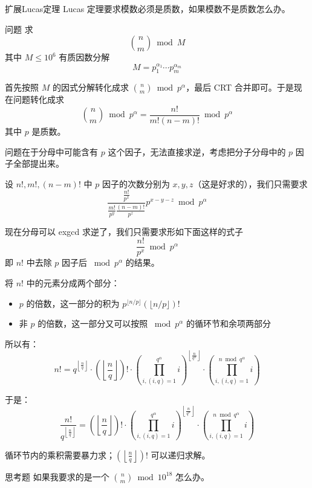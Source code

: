\documentclass[UTF8]{beamer}
\begin{document}
    \begin{frame}{扩展Lucas定理}
        Lucas 定理要求模数必须是质数，如果模数不是质数怎么办。
        \begin{block}{问题}
            求
            $$
            \binom{n}{m}\bmod M
            $$
            其中 $M\le 10^6$ 有质因数分解
            $$
            M = p_1^{\alpha_1}\cdots p_m^{\alpha_m}
            $$
        \end{block}
        \pause

        首先按照 $M$ 的因式分解转化成求 $\binom{n}{m}\bmod p^{\alpha}$，最后 CRT 合并即可。于是现在问题转化成求
        $$
        \binom{n}{m}\bmod p^\alpha=\frac{n!}{m!(n-m)!}\bmod p^\alpha
        $$
        其中 $p$ 是质数。
    \end{frame}

    \begin{frame}
        问题在于分母中可能含有 $p$ 这个因子，无法直接求逆，考虑把分子分母中的 $p$ 因子全部提出来。

        设 $n!,m!,(n-m)!$ 中 $p$ 因子的次数分别为 $x,y,z$（这是好求的），我们只需要求
        $$
        \frac{\frac{n!}{p^x}}{\frac{m!}{p^y}\frac{(n-m)!}{p^z}}p^{x-y-z}\bmod p^\alpha
        $$

        现在分母可以 exgcd 求逆了，我们只需要求形如下面这样的式子
        $$
        \frac{n!}{p^x}\bmod p^{\alpha}
        $$
        即 $n!$ 中去除 $p$ 因子后 $\bmod p^{\alpha}$ 的结果。
    \end{frame}
    
    \begin{frame}
        将 $n!$ 中的元素分成两个部分：
        \begin{itemize}
            \item $p$ 的倍数，这一部分的积为 $p^{\lfloor n/p\rfloor}(\lfloor n/p\rfloor)!$
            \item 非 $p$ 的倍数，这一部分又可以按照 $\bmod p^{\alpha}$ 的循环节和余项两部分
        \end{itemize}
        所以有：
$$
n! = q^{\left\lfloor\frac{n}{q}\right\rfloor} \cdot \left(\left\lfloor\frac{n}{q}\right\rfloor\right)! \cdot {\left(\prod_{i,(i,q)=1}^{q^\alpha}i\right)}^{\left\lfloor\frac{n}{q^\alpha}\right\rfloor} \cdot \left(\prod_{i,(i,q)=1}^{n\bmod q^\alpha}i\right)
$$

于是：
$$
\frac{n!}{q^{\left\lfloor\frac{n}{q}\right\rfloor}} = \left(\left\lfloor\frac{n}{q}\right\rfloor\right)! \cdot {\left(\prod_{i,(i,q)=1}^{q^\alpha}i\right)}^{\left\lfloor\frac{n}{q^\alpha}\right\rfloor} \cdot \left(\prod_{i,(i,q)=1}^{n\bmod q^\alpha}i\right)
$$

循环节内的乘积需要暴力求；$\displaystyle \left(\left\lfloor\frac{n}{q}\right\rfloor\right)!$ 可以递归求解。
\pause
\begin{block}{思考题}
    如果我要求的是一个 $\binom{n}{m}\bmod 10^{18}$ 怎么办。
\end{block}
    \end{frame}
\end{document}
